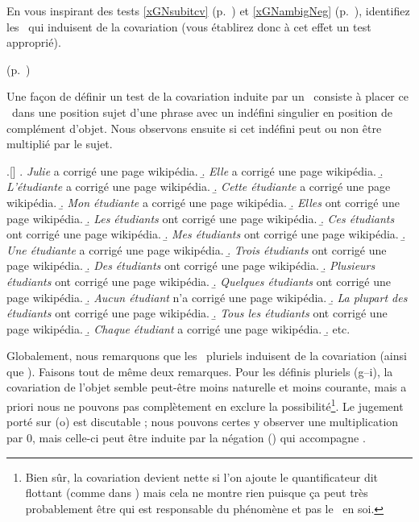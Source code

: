 \begin{exo}\label{exoInduCovar}
En vous inspirant des tests \ref{xGNsubitcv} (p.~\pageref{xGNsubitcv}) et \ref{xGNambigNeg} (p.~\pageref{xGNambigNeg}), 
identifiez les
 \GN\ qui induisent de la covariation (vous établirez donc à cet effet un test approprié). 
\begin{solu}(p.~\pageref{exoInduCovar})\label{crg:InduCovar}

Une façon de définir un test de la covariation induite par un \GN\ consiste à placer ce \GN\ dans une position sujet d'une phrase avec un indéfini singulier en position de complément d'objet.  Nous observons ensuite si cet indéfini peut ou non être multiplié par le sujet. 

\ex.[]
\a.  \emph{Julie} a corrigé une page wikipédia.
\b.  \emph{Elle} a corrigé une page wikipédia.
\b.  \emph{L'étudiante} a corrigé une page wikipédia.
\b.  \emph{Cette étudiante} a corrigé une page wikipédia.
\b.  \emph{Mon étudiante} a corrigé une page wikipédia.
\b.  \jcovar \emph{Elles} ont corrigé une page wikipédia.
\b.  \jcovar \emph{Les étudiants} ont corrigé une page wikipédia.
\b.  \jcovar \emph{Ces étudiants} ont corrigé une page wikipédia.
\b.  \jcovar \emph{Mes étudiants} ont corrigé une page wikipédia.
\b.  \emph{Une étudiante} a corrigé une page wikipédia.
\b.  \jcovar \emph{Trois étudiants} ont corrigé une page wikipédia.
\b.  \jcovar \emph{Des étudiants} ont corrigé une page wikipédia.
\b.  \jcovar \emph{Plusieurs étudiants} ont corrigé une page wikipédia.
\b.  \jcovar \emph{Quelques étudiants} ont corrigé une page wikipédia.
\b.  \jcovar \emph{Aucun étudiant} n'a corrigé une page wikipédia.
\b.  \jcovar \emph{La plupart des étudiants} ont corrigé une page wikipédia.
\b.  \jcovar \emph{Tous les étudiants} ont corrigé une page wikipédia.
\b.  \jcovar \emph{Chaque étudiant} a corrigé une page wikipédia.
\b. etc.


Globalement, nous remarquons que les \GN\ pluriels induisent de la covariation (ainsi que ).  Faisons tout de même deux remarques.  Pour les définis pluriels (g--i), la covariation de l'objet semble peut-être moins naturelle et moins courante, mais a priori nous ne pouvons pas complètement en exclure la possibilité\footnote{Bien sûr, la covariation devient nette si l'on ajoute le quantificateur dit flottant  (comme dans ) mais cela ne montre rien puisque ça peut très probablement être  qui est responsable du phénomène et pas le \GN\ en soi.}.  Le jugement porté sur  (o) est discutable ; nous pouvons certes y observer une multiplication par $0$, mais celle-ci peut être induite par la négation () qui accompagne .
\end{solu}
\end{exo}
